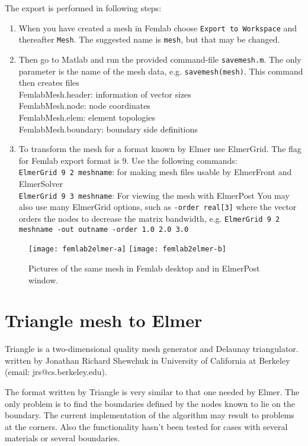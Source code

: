 The export is performed in following steps:
\begin{enumerate}
\item When you have created a mesh in Femlab choose \texttt{Export to
Workspace} and thereafter \texttt{Mesh}. The suggested name is \texttt{mesh}, but that
may be changed.  
%
\item Then go to Matlab and run the provided 
command-file \texttt{savemesh.m}. The only parameter is the name of the mesh
data, e.g. \texttt{savemesh(mesh)}. This command then creates files \\
FemlabMesh.header: information of vector sizes  \\
FemlabMesh.node: node coordinates  \\
FemlabMesh.elem: element topologies  \\
FemlabMesh.boundary: boundary side definitions  
%
\item To transform the mesh for a format known by
Elmer use ElmerGrid. The flag for Femlab export format is 9. Use the
following commands:  \\
\texttt{ElmerGrid 9 2 meshname}: for making mesh files
usable by ElmerFront and ElmerSolver  \\ 
\texttt{ElmerGrid 9 3 meshname}: For viewing the mesh with ElmerPost  
You may also use many ElmerGrid
options, such as \texttt{-order real[3]} 
where the vector orders the nodes to
decrease the matrix bandwidth, e.g. \texttt{ElmerGrid 9 2 meshname -out outname
-order 1.0 2.0 3.0}
\end{enumerate}

\begin{figure}
\begin{center}
\texttt{[image: femlab2elmer-a]}
\hspace{10mm}
\texttt{[image: femlab2elmer-b]}
\end{center}
\caption{Pictures of the same mesh in Femlab desktop and in ElmerPost window.}
\end{figure}


\section{Triangle mesh to Elmer}

Triangle is a two-dimensional quality mesh generator and Delaunay triangulator.
written by Jonathan Richard Shewchuk
in University of California at Berkeley (email: jrs@cs.berkeley.edu).

The format written by Triangle is very similar to that one needed by Elmer. 
The only problem is to find the boundaries defined by the nodes known
to lie on the boundary. The current implementation of the algorithm may
result to problems at the corners. Also the functionality hasn't been tested for
cases with several materials or several boundaries.

